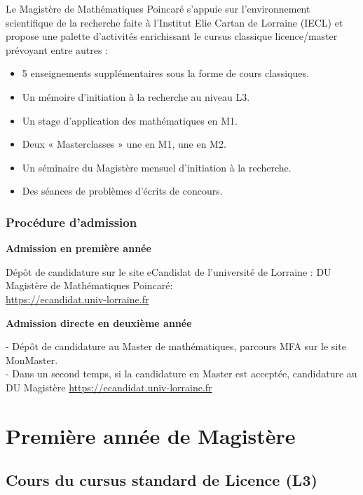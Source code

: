 \documentclass[slidetop,11pt]{beamer}
\begin{document}
\begin{frame}
Le Magistère de Mathématiques Poincaré s'appuie sur l'environnement scientifique de la recherche faite à l'Institut Elie Cartan de Lorraine (IECL) et propose une palette d'activités enrichissant le cursus classique licence/master prévoyant entre autres :
\begin{itemize}
\item 5 enseignements supplémentaires sous la forme de cours classiques.
\item Un mémoire d'initiation à la recherche au niveau L3.
\item Un stage d'application des mathématiques en M1.
\item Deux « Masterclasses » une en M1, une en M2.
\item Un séminaire du Magistère mensuel d'initiation à la recherche.
\item Des séances de problèmes d'écrits de concours.
\end{itemize}

\end{frame}

\begin{frame}
\frametitle{Procédure d'admission}

\textbf{Admission en première année}

\bigskip
Dépôt de candidature sur le site eCandidat de l'université de Lorraine : \og DU Magistère de Mathématiques Poincaré\fg : \\
\url{https://ecandidat.univ-lorraine.fr}

\bigskip
\textbf{Admission directe en deuxième année}

\bigskip
- Dépôt de candidature au Master de mathématiques, parcours MFA sur le site MonMaster.\\
- Dans un second temps, si la candidature en Master est acceptée, candidature au DU Magistère \url{https://ecandidat.univ-lorraine.fr}


\end{frame}



\section{Première année de Magistère}

\subsection{Cours du cursus standard de Licence (L3)}
\end{document}
